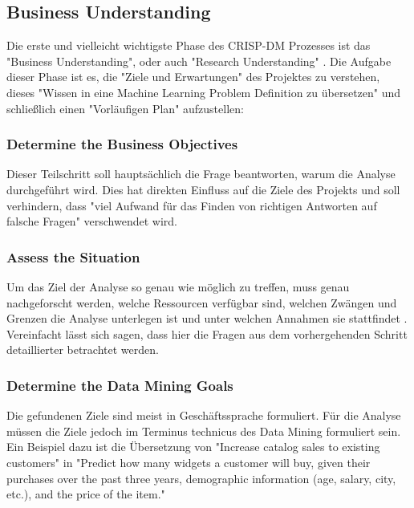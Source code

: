 \subsection{Business Understanding}
Die erste und vielleicht wichtigste Phase \citep[S.~14]{shearer_crisp-dm_2000} des CRISP-DM Prozesses ist das "Business Understanding", oder auch "Research Understanding" \citep[Punkt 1.4.1.1]{larose_discovering_2014}. Die Aufgabe dieser Phase ist es, die "Ziele und Erwartungen" \citep[S.~73]{swamynathan_mastering_2017} des Projektes zu verstehen, dieses "Wissen in eine Machine Learning Problem Definition zu übersetzen" und schließlich einen "Vorläufigen Plan" \citep[S.~14]{shearer_crisp-dm_2000} aufzustellen: 
\subsubsection{Determine the Business Objectives}
Dieser Teilschritt soll hauptsächlich die Frage beantworten, warum die Analyse durchgeführt wird. Dies hat direkten Einfluss auf die Ziele des Projekts und soll verhindern, dass "viel Aufwand für das Finden von richtigen Antworten auf falsche Fragen" \citep[S.~14]{chapman_crisp-dm_2000} verschwendet wird.
\subsubsection{Assess the Situation}
Um das Ziel der Analyse so genau wie möglich zu treffen, muss genau nachgeforscht werden, welche Ressourcen verfügbar sind, welchen Zwängen und Grenzen die Analyse unterlegen ist und unter welchen Annahmen sie stattfindet \citep[S.~14]{chapman_crisp-dm_2000}. Vereinfacht lässt sich sagen, dass hier die Fragen aus dem vorhergehenden Schritt detaillierter betrachtet werden.
\subsubsection{Determine the Data Mining Goals}
Die gefundenen Ziele sind meist in Geschäftssprache formuliert. Für die Analyse müssen die Ziele jedoch im Terminus technicus des Data Mining formuliert sein. Ein Beispiel dazu ist die Übersetzung von "Increase catalog sales to existing customers" in "Predict how many widgets a customer will buy, given their purchases over the
past three years, demographic information (age, salary, city, etc.), and the price of the item." \citep[S.~16]{chapman_crisp-dm_2000}
